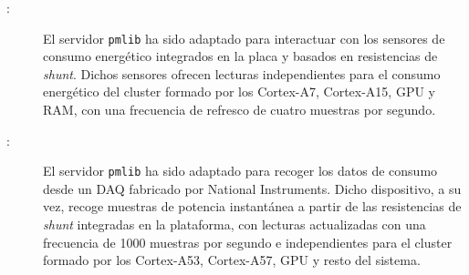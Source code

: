 \begin{description}

\item[\odroid:] El servidor {\tt pmlib} ha sido adaptado para interactuar
  con los sensores de consumo energético integrados en la placa y basados
  en resistencias de {\em shunt}. Dichos sensores ofrecen lecturas
  independientes para el consumo energético del cluster formado por los
  Cortex-A7, Cortex-A15, GPU y RAM, con una frecuencia de refresco de
  cuatro muestras por segundo.

\item[\juno:] El servidor {\tt pmlib} ha sido adaptado para recoger los
  datos de consumo desde un DAQ fabricado por National Instruments. Dicho
  dispositivo, a su vez, recoge muestras de potencia instantánea a partir
  de las resistencias de {\em shunt} integradas en la plataforma, con
  lecturas actualizadas con una frecuencia de 1000 muestras por segundo e
  independientes para el cluster formado por los Cortex-A53, Cortex-A57,
  GPU y resto del sistema.

\end{description}

